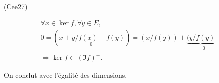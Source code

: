\begin{tiny}(Cee27)\end{tiny}
\begin{multline*}
 \forall x \in \ker f, \forall y \in E,\;\\
 0 = (x + y / \underset{=0}{f(x)} + f(y) ) 
 = (x / f(y)) + \underset{ = 0}{\underbrace{(y / f(y)}} \\
 \Rightarrow \ker f \subset (\Im f)^{\bot}.
\end{multline*}

On conclut avec l'égalité des dimensions.
